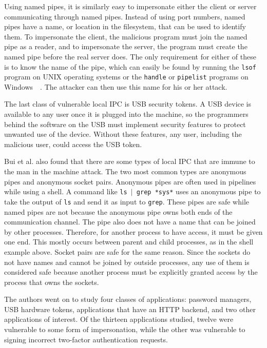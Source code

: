 Using named pipes, it is similarly easy to impersonate either the client or server communicating through named pipes.  Instead of using port numbers, named pipes have a name, or location in the filesystem, that can be used to identify them.  To impersonate the client, the malicious program must join the named pipe as a reader, and to impersonate the server, the program must create the named pipe before the real server does.  The only requirement for either of these is to know the name of the pipe, which can easily be found by running the \texttt{lsof} program on UNIX operating systems or the \texttt{handle} or \texttt{pipelist} programs on Windows~\cite{russinovich_2018}~\cite{markruss_sharkey_2016}.  The attacker can then use this name for his or her attack.

The last class of vulnerable local IPC is USB security tokens.  A USB device is available to any user once it is plugged into the machine, so the programmers behind the software on the USB must implement security features to protect unwanted use of the device.  Without these features, any user, including the malicious user, could access the USB token.

Bui et al. also found that there are some types of local IPC that are immune to the man in the machine attack.  The two most common types are anonymous pipes and anonymous socket pairs.  Anonymous pipes are often used in pipelines while using a shell.  A command like \texttt{ls $|$ grep *sys*} uses an anonymous pipe to take the output of \texttt{ls} and send it as input to \texttt{grep}.  These pipes are safe while named pipes are not because the anonymous pipe owns both ends of the communication channel.  The pipe also does not have a name that can be joined by other processes.  Therefore, for another process to have access, it must be given one end.  This mostly occurs between parent and child processes, as in the shell example above.  Socket pairs are safe for the same reason.  Since the sockets do not have names and cannot be joined by outside processes, any use of them is considered safe because another process must be explicitly granted access by the process that owns the sockets.

The authors went on to study four classes of applications: password managers, USB hardware tokens, applications that have an HTTP backend, and two other applications of interest.  Of the thirteen applications studied, twelve were vulnerable to some form of impersonation, while the other was vulnerable to signing incorrect two-factor authentication requests.

